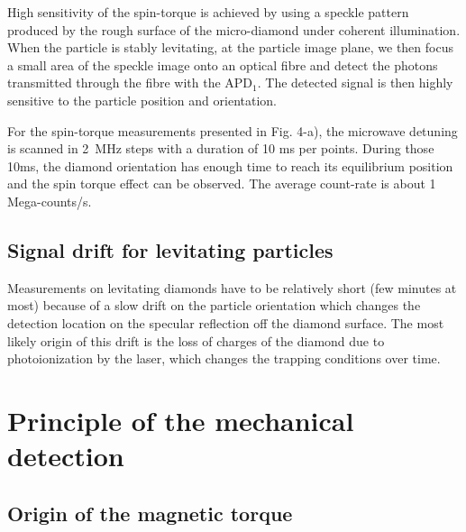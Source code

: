 \documentclass[preprintnumbers,amsmath,amssymb,onecolumn,12pt]{revtex4}
\begin{document}
High sensitivity of the spin-torque is achieved by using a speckle pattern produced by the rough surface of the micro-diamond under coherent illumination. When the particle is stably levitating, at the particle image plane, we then focus a small area of the speckle image onto an optical fibre and detect the photons transmitted through the fibre with the APD$_1$. The detected signal is then highly sensitive to the particle position and orientation.

For the spin-torque measurements presented in Fig. 4-a), the microwave detuning is scanned in 2~MHz steps with a duration of 10 ms per points. During those 10ms, the diamond orientation has enough time to reach its equilibrium position and the spin torque effect can be observed. The average count-rate is about 1 Mega-counts/s. 

\subsection{Signal drift for levitating particles}

Measurements on levitating diamonds have to be relatively short (few minutes at most) because of a slow drift on the particle orientation which changes the detection location on the specular reflection off the diamond surface. The most likely origin of this drift is the loss of charges of the diamond due to photoionization by the laser, which changes the trapping conditions over time.



%

\section{Principle of the mechanical detection}


\subsection{Origin of the magnetic torque}
\end{document}
